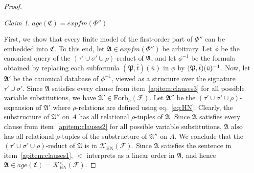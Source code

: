 \documentclass[oneside,reqno,12pt]{amsart}
\theoremstyle{plain}
\theoremstyle{remark}
\newtheorem{claim}[thm]{Claim}
\newenvironment{claimproof}[1][\proofname]
{\renewcommand\qedsymbol{$\diamond$}\proof[#1]}
{\endproof}
\newcommand{\struct}[1]{\mathfrak{#1}}
\newcommand{\age}{\ensuremath{\mathit{age}}\xspace}
\newcommand{\efm}{\ensuremath{\mathit{expfm}}\xspace}
\newcommand{\pre}[1]{#1\smash{^{-1}}}
\newcommand{\Forb}{\ensuremath{\mathrm{Forb}}\xspace}
\begin{document}
{\begin{proof}
\begin{claim} \label{claim:age_coloured}
    $\age(\struct{C})=\efm(\Phi'')$
\end{claim}
\begin{claimproof} First, we show that every finite model of the first-order part of $\Phi''$ can be embedded into $\struct{C}$. 
To this end, let $\struct{A}\in \efm(\Phi'')$ be arbitrary.
Let $\phi$ be the canonical query of the $(\tau'\cup \sigma' \cup \rho)$-reduct of $\struct{A}$, and let $\phi^{-1}$ be the formula obtained by replacing each subformula $(\struct P,\bar t)(\bar{u})$ in $\phi$ by $\pre{(\struct P,\bar t)(\bar{u})}$.
Now, let $\struct{A}'$ be the canonical database of $\phi^{-1}$, viewed as a structure over the signature $\tau'\cup \sigma'$.
Since $\struct{A}$ satisfies every clause from item~\eqref{apitem:clauses3} for all possible variable substitutions, we have $\struct{A}'\in \Forb_h(\mathcal{F})$.
Let $\struct{A}''$ be the $(\tau'\cup \sigma' \cup \rho)$-expansion of $\struct{A}'$ where $\rho$-relations are defined using eq.~\eqref{eq:HN}.
Clearly, the substructure of $\struct{A}''$ on $A$ has all relational $\rho$-tuples of $\struct{A}$.
Since $\struct{A}$ satisfies every clause from item~\eqref{apitem:clauses2} for all possible variable substitutions, $\struct{A}$ also has all relational $\rho$-tuples of the substructure of $\struct{A}''$ on $A$.
We conclude that the $(\tau'\cup \sigma' \cup \rho)$-reduct of $\struct{A}$ is in $\mathcal{K}_{\mathrm{HN}}(\mathcal{F})$.
Since $\struct{A}$ satisfies the sentence in item~\eqref{apitem:clauses1}, $<$ interprets as a linear order in $\struct{A}$, and hence  $\struct{A}\in  \age(\struct{C})=\mathcal{K}^{<}_{\mathrm{HN}}(\mathcal{F})$.  


\end{claimproof}
\end{proof}}
\end{document}
